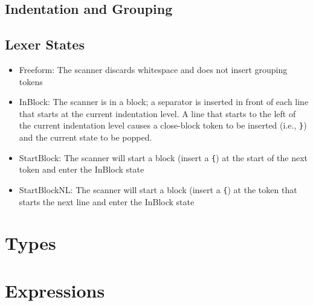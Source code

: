 \documentclass{article}
\begin{document}
\subsection{Indentation and Grouping}

\subsection{Lexer States}

\begin{itemize}

\item Freeform: The scanner discards whitespace and does not insert
  grouping tokens
  
\item InBlock: The scanner is in a block; a separator is inserted in
  front of each line that starts at the current indentation level.  A
  line that starts to the left of the current indentation level causes
  a close-block token to be inserted (i.e., \lstinline!}!) and the
    current state to be popped.
    
\item StartBlock: The scanner will start a block (insert a
  \lstinline!{!) at the start of the next token and enter the InBlock
    state
    
\item StartBlockNL: The scanner will start a block (insert a
  \lstinline!{!) at the token that starts the next line and enter the InBlock
    state

\end{itemize}

\section{Types}

\section{Expressions}
\end{document}
